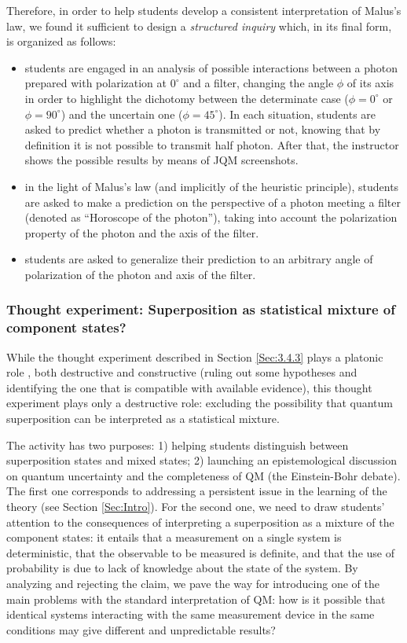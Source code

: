 \documentclass[twocolumn,secnumarabic,amssymb, nobibnotes, aps, prd, nofootinbib]{revtex4-2}
\begin{document}
Therefore, in order to help students develop a consistent interpretation of Malus's law, we found it sufficient to design a \emph{structured inquiry} \cite{Llewellyn2012} which, in its final form, is organized as follows:
\begin{itemize}
    \item students are engaged in an analysis of possible interactions between a photon prepared with polarization at $0^{\circ}$ and a filter, changing the angle $\phi$ of its axis in order to highlight the dichotomy between the determinate case ($\phi=0^{\circ}$ or $\phi=90^{\circ}$) and the uncertain one ($\phi=45^{\circ}$). In each situation, students are asked to predict whether a photon is transmitted or not, knowing that by definition it is not possible to transmit half photon. After that, the instructor shows the possible results by means of JQM screenshots.
    \item in the light of Malus's law (and implicitly of the heuristic principle), students are asked to make a prediction on the perspective of a photon meeting a filter (denoted as ``Horoscope of the photon''), taking into account the polarization property of the photon and the axis of the filter.
    \item students are asked to generalize their prediction to an arbitrary angle of polarization of the photon and axis of the filter.
\end{itemize}


\subsubsection{Thought experiment: Superposition as statistical mixture of component states?} \label{Sec:3.4.4}
While the thought experiment described in Section \ref{Sec:3.4.3} plays a platonic role \cite{Brown1991}, both destructive and constructive (ruling out some hypotheses and identifying the one that is compatible with available evidence), this thought experiment plays only a destructive role: excluding the possibility that quantum superposition can be interpreted as a statistical mixture.

The activity has two purposes: 1) helping students distinguish between superposition states and mixed states; 2) launching an epistemological discussion on quantum uncertainty and the completeness of QM (the Einstein-Bohr debate). The first one corresponds to addressing a persistent issue in the learning of the theory (see Section \ref{Sec:Intro}). For the second one, we need to draw students' attention to the consequences of interpreting a superposition as a mixture of the component states: it entails that a measurement on a single system is deterministic, that the observable to be measured is definite, and that the use of probability is due to lack of knowledge about the state of the system. By analyzing and rejecting the claim, we pave the way for introducing one of the main problems with the standard interpretation of QM: how is it possible that identical systems interacting with the same measurement device in the same conditions may give different and unpredictable results?
\end{document}
